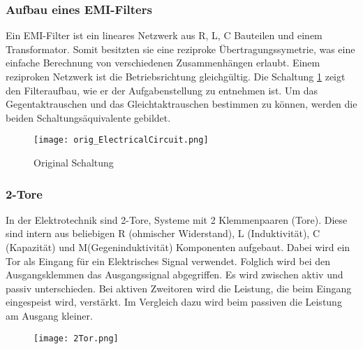 \subsubsection{Aufbau eines EMI-Filters} \label{subsubsec:emi_filter}
Ein EMI-Filter ist ein lineares Netzwerk aus R, L, C Bauteilen und einem Transformator. Somit besitzten sie eine reziproke Übertragungssymetrie, was eine einfache Berechnung von verschiedenen Zusammenhängen erlaubt. Einem reziproken Netzwerk ist die Betriebsrichtung gleichgültig.
Die Schaltung \ref{fig:orig_Schaltung}  zeigt den Filteraufbau, wie er der Aufgabenstellung zu entnehmen ist. Um das Gegentaktrauschen und das Gleichtaktrauschen bestimmen zu können, werden die beiden Schaltungsäquivalente gebildet. 

\begin{figure}[H]
	\centering
	\texttt{[image: orig\_ElectricalCircuit.png]}
	\caption{Original Schaltung \cite{aufgabenstellung}}
	\label{fig:orig_Schaltung}
\end{figure}


\subsubsection{2-Tore} \label{subsubsec:emi_filter}

In der Elektrotechnik sind 2-Tore, Systeme mit 2 Klemmenpaaren (Tore). 
Diese sind intern aus beliebigen R (ohmischer Widerstand), L (Induktivität), C (Kapazität) und M(Gegeninduktivität) Komponenten aufgebaut. 
Dabei wird ein Tor als Eingang für ein Elektrisches Signal verwendet. Folglich wird bei den Ausgangsklemmen das Ausgangssignal abgegriffen. 
Es wird zwischen aktiv und passiv unterschieden.
Bei aktiven Zweitoren wird die Leistung, die beim Eingang eingespeist wird, verstärkt. 
Im Vergleich dazu wird beim passiven die Leistung am Ausgang kleiner.

\begin{figure}[H]
	\centering
	\texttt{[image: 2Tor.png]}
	\label{fig:übersicht}
\end{figure}